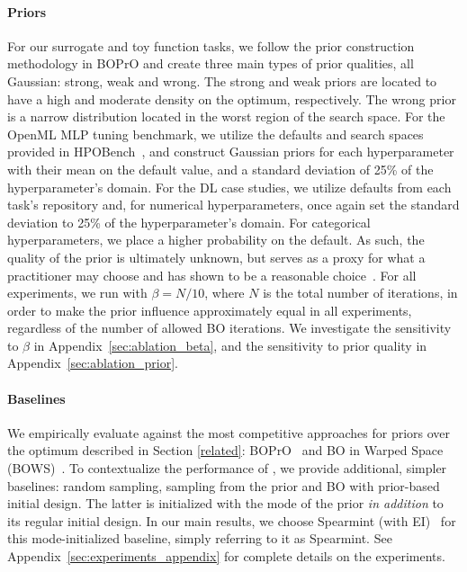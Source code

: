 \documentclass{article}
\newcommand{\frank}[1]{\todo[color=yellow]{Frank: #1}} %
\newcommand{\carl}[1]{{\todo[color=purple]{Carl: #1}}}
\newcommand{\method}[0]{\text{${\pi}$BO}\xspace}
\begin{document}
\vspace*{-0.1cm}\paragraph{Priors}
For our surrogate and toy function tasks,  we follow the prior construction methodology in BOPrO \citep{souza2021bayesian} and create three main types of prior qualities, all Gaussian: strong, weak and wrong. The strong and weak priors are located to have a high and moderate density on the optimum, respectively. The wrong prior is a narrow distribution located in the worst region of the search space. For the OpenML MLP tuning benchmark, we utilize the defaults and search spaces provided in HPOBench~\citep{eggensperger2021hpobench}, and construct Gaussian priors for each hyperparameter with their mean on the default value, and a standard deviation of 25\% of the hyperparameter's domain. For the DL case studies, we utilize defaults from each task's repository
and, for numerical hyperparameters, once again set the standard deviation to 25\% of the hyperparameter's domain. For categorical hyperparameters, we place a higher probability on the default. As such, the quality of the prior is ultimately unknown, but serves as a proxy for what a practitioner may choose and has shown to be a reasonable choice~\citep{AnastacioH20}. For all experiments, we run \method with $\beta = N/10$, where $N$ is the total number of iterations,
in order to make the prior influence approximately equal in all experiments, regardless of the number of allowed BO iterations. We investigate the sensitivity to $\beta$ in Appendix~\ref{sec:ablation_beta}, and the sensitivity to prior quality in Appendix~\ref{sec:ablation_prior}.

\vspace*{-0.1cm}
\paragraph{Baselines}
We empirically evaluate \method against the most competitive approaches for priors over the optimum described in Section \ref{related}: BOPrO~\citep{souza2021bayesian} and BO in Warped Space (BOWS)~\citep{RAMACHANDRAN2020105663}. To contextualize the performance of \method{}, we provide additional, simpler baselines: random sampling, sampling from the prior and BO with prior-based initial design. The latter is initialized with the mode of the prior \textit{in addition} to its regular initial design. In our main results, we choose Spearmint (with EI)~\citep{snoek-nips12a} for this mode-initialized baseline, simply referring to it as Spearmint. See Appendix~\ref{sec:experiments_appendix} for complete details on the experiments.
\end{document}
